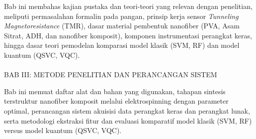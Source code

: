 Bab ini membahas kajian pustaka dan teori-teori yang relevan dengan penelitian, meliputi permasalahan formalin pada pangan, prinsip kerja sensor \textit{Tunneling Magnetoresistance} (TMR), dasar material pembentuk nanofiber (PVA, Asam Sitrat, ADH, dan nanofiber komposit), komponen instrumentasi perangkat keras, hingga dasar teori pemodelan komparasi model klasik (SVM, RF) dan model kuantum (QSVC, VQC).
\\
\\
BAB III: METODE PENELITIAN DAN PERANCANGAN SISTEM

Bab ini memuat daftar alat dan bahan yang digunakan, tahapan sintesis terstruktur nanofiber komposit melalui elektrospinning dengan parameter optimal, perancangan sistem akuisisi data perangkat keras dan perangkat lunak, serta metodologi ekstraksi fitur dan evaluasi komparatif model klasik (SVM, RF) versus model kuantum (QSVC, VQC).
